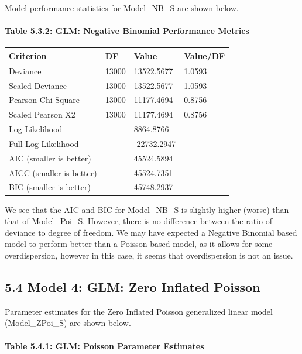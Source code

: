 \documentclass[]{article}
\let\oldparagraph\paragraph
\renewcommand{\paragraph}[1]{\oldparagraph{#1}\mbox{}}
\begin{document}
Model performance statistics for Model\_NB\_S are shown below.

\paragraph{Table 5.3.2: GLM: Negative Binomial Performance
Metrics}\label{table-5.3.2-glm-negative-binomial-performance-metrics}

\begin{longtable}[]{@{}llll@{}}
\toprule
Criterion & DF & Value & Value/DF\tabularnewline
\midrule
\endhead
Deviance & 13000 & 13522.5677 & 1.0593\tabularnewline
Scaled Deviance & 13000 & 13522.5677 & 1.0593\tabularnewline
Pearson Chi-Square & 13000 & 11177.4694 & 0.8756\tabularnewline
Scaled Pearson X2 & 13000 & 11177.4694 & 0.8756\tabularnewline
Log Likelihood & & 8864.8766 &\tabularnewline
Full Log Likelihood & & -22732.2947 &\tabularnewline
AIC (smaller is better) & & 45524.5894 &\tabularnewline
AICC (smaller is better) & & 45524.7351 &\tabularnewline
BIC (smaller is better) & & 45748.2937 &\tabularnewline
\bottomrule
\end{longtable}

We see that the AIC and BIC for Model\_NB\_S is slightly higher (worse)
than that of Model\_Poi\_S. However, there is no difference between the
ratio of deviance to degree of freedom. We may have expected a Negative
Binomial based model to perform better than a Poisson based model, as it
allows for some overdispersion, however in this case, it seems that
overdispersion is not an issue.

\subsection{5.4 Model 4: GLM: Zero Inflated
Poisson}\label{model-4-glm-zero-inflated-poisson}

Parameter estimates for the Zero Inflated Poisson generalized linear
model (Model\_ZPoi\_S) are shown below.

\paragraph{Table 5.4.1: GLM: Poisson Parameter
Estimates}\label{table-5.4.1-glm-poisson-parameter-estimates}
\end{document}
